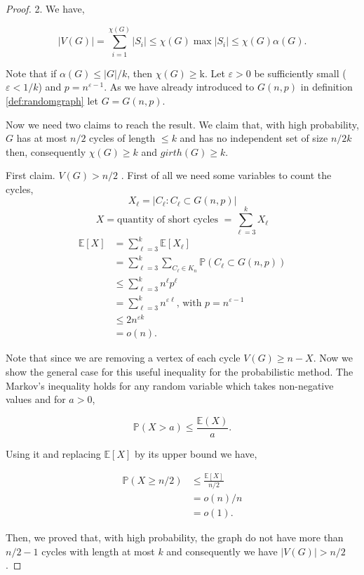 \documentclass[12pt,twoside,a4paper,bibliography=totocnumbered]{book}
\numberwithin{equation}{section}
\theoremstyle{remark}
\begin{document}
\begin{proof}2.
We have,

$$ |V(G)| = \sum_{i=1}^{\chi(G)} |S_i| \leq \chi(G)\max|S_i| \leq \chi(G) \alpha (G) .$$

Note that if $\alpha(G) \leq |G|/k$, then $\chi(G) \geq $k. Let $\varepsilon > 0$ be sufficiently small ($\varepsilon < 1/k$) and $p = n^{\varepsilon - 1}$. As we have already introduced to $G(n,p)$ in definition \ref{def:randomgraph} let $G = G(n,p) $.%

Now we need two claims to reach the result. We claim that, with high probability, $G$ has at most $n/2$ cycles of length $\leq k$ and has no independent set  of size $n/2k$ then, consequently $\chi(G) \geq k$ and $girth(G) \geq k$.

First claim. $V(G) > n/2$ . First of all we need some variables to count the cycles,
$$X_{\ell} =  |C_{\ell} : C_{\ell} \subset G(n,p)|$$
$$X = \text{quantity of short cycles } = \sum_{{\ell}=3}^k X_{\ell}$$
\begin{align*}
\mathbb{E}[X] &= \sum_{{\ell}=3}^k \mathbb{E}[X_{\ell}] \\
	       &= \sum_{{\ell}=3}^k \sum_{C_{\ell} \in K_n} \mathbb{P}(C_{\ell} \subset G(n,p))\\
	       &\leq \sum_{{\ell}=3}^k n^{\ell} p^{\ell} \\
	       &= \sum_{{\ell}=3}^k n^{\varepsilon {\ell}}\text{, with } p= n^{\varepsilon - 1}\\
	       &\leq 2n^{\varepsilon k} \\
	       &= o(n).
\end{align*}

Note that since we are removing a vertex of each cycle $V(G) \geq n-X$. Now we show the general case for this useful inequality for the probabilistic method. The Markov's inequality holds for any random variable which takes non-negative values and for $a>0$,

$$\mathbb{P}(X>a) \leq \frac{\mathbb{E}(X)}{a}.$$

Using it and replacing $\mathbb{E}[X]$ by its upper bound we have,

\begin{align*}
\mathbb{P}(X\geq n/2) &\leq \frac{\mathbb{E}[X]}{n/2}\\
		& = o(n)/n\\
		& = o(1).
\end{align*}

Then, we proved that, with high probability, the graph do not have more than $n/2 -1$ cycles with length at most $k$ and consequently we have $|V(G)| > n/2$ .


\end{proof}
\end{document}
